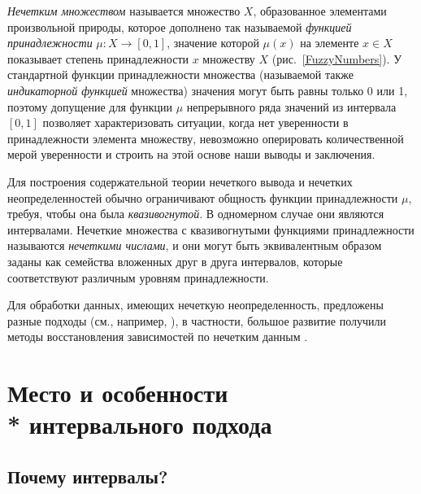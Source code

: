 \documentclass[a5paper,openany]{book}
\begin{document}
{{%

\emph{Нечетким множеством} %
называется множество $X$, 
образованное элементами произвольной природы, которое дополнено так называемой 
\emph{функцией принадлежности} $\mu: X\to[0, 1]$, значение которой $\mu(x)$ на элементе 
$x\in X$ показывает степень принадлежности $x$ множеству $X$ (рис.~\ref{FuzzyNumbers}). 
У стандартной функции принадлежности множества (называемой также \emph{индикаторной функцией} 
множества) значения могут быть равны только 0 или 1, поэтому допущение для функции $\mu$ 
непрерывного ряда значений из интервала $[0, 1]$ позволяет характеризовать ситуации, когда 
нет уверенности в принадлежности элемента множеству, невозможно оперировать количественной мерой   
уверенности и строить на этой основе наши выводы и заключения.

Для построения содержательной теории нечеткого вывода и нечетких неопределенностей 
обычно ограничивают общность функции принадлежности $\mu$, требуя, чтобы она была 
\emph{квазивогнутой}. 
В одномерном случае они являются интервалами. 
Нечеткие множества с квазивогнутыми 
функциями принадлежности называются \emph{нечеткими числами}, и они могут быть 
эквивалентным образом заданы как семейства вложенных друг в друга интервалов, 
которые соответствуют различным уровням принадлежности.   

Для обработки данных, имеющих нечеткую неопределенность, предложены разные подходы 
(см., например, \cite{NguyenKreinWuXiang}), в частности, 
большое развитие получили методы восстановления зависимостей по нечетким данным \cite{Boukezzoula2021}. 



	\section[Место и особенности интервального подхода]%
{Место и особенности \\* интервального подхода} 


\subsection{Почему интервалы?} \label{NatureIntervals} 

}}
\end{document}
